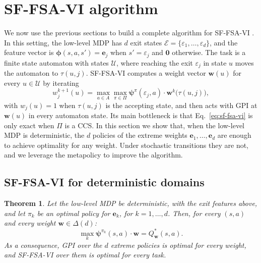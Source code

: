 \documentclass[11pt]{article}
\newcommand{\vphi}{\bm{\phi}}      %
\newcommand{\vpsi}{\bm{\psi}}      %
\newtheorem{theorem}{Theorem}
\begin{document}
\section{SF-FSA-VI algorithm}\label{sec:fsa}

We now use the previous sections to build a complete algorithm for SF-FSA-VI \cite{kuric_planning_2024}. In this setting, the low-level MDP has $d$ exit states $\mathcal{E} = \{\varepsilon_1, \dots, \varepsilon_d\}$, and the feature vector is $\vphi(s,a,s') = \mathbf{e}_j$ when $s' = \varepsilon_j$ and $\mathbf{0}$ otherwise. The task is a finite state automaton with states $\mathcal{U}$, where reaching the exit $\varepsilon_j$ in state $u$ moves the automaton to $\tau(u,j)$. SF-FSA-VI computes a weight vector $\mathbf{w}(u)$ for every $u \in \mathcal{U}$ by iterating
\begin{equation}\label{eq:sf-fsa-vi}
    w^{k+1}_j(u) = \max_{a \in A} \max_{\pi \in \Pi} \vpsi^{\pi}(\varepsilon_j, a) \cdot \mathbf{w}^k\big(\tau(u,j)\big),
\end{equation}
with $w_j(u) = 1$ when $\tau(u,j)$ is the accepting state, and then acts with GPI at $\mathbf{w}(u)$ in every automaton state. Its main bottleneck is that Eq.~\eqref{eq:sf-fsa-vi} is only exact when $\Pi$ is a CCS. In this section we show that, when the low-level MDP is deterministic, the $d$ policies of the extreme weights $\mathbf{e}_1, \dots, \mathbf{e}_d$ are enough to achieve optimality for any weight. Under stochastic transitions they are not, and we leverage the metapolicy to improve the algorithm.

\subsection{SF-FSA-VI for deterministic domains}

\begin{theorem}\label{thm:det}
    Let the low-level MDP be deterministic, with the exit features above, and let $\pi_k$ be an optimal policy for $\mathbf{e}_k$, for $k = 1, \dots, d$. Then, for every $(s,a)$ and every weight $\mathbf{w} \in \Delta(d)$: 
    \begin{equation}
        \max_{k} \vpsi^{\pi_k}(s,a) \cdot \mathbf{w} = Q^{*}_{\mathbf{w}}(s,a).
    \end{equation}
    As a consequence, GPI over the $d$ extreme policies is optimal for every weight, and SF-FSA-VI over them is optimal for every task.
\end{theorem}
\end{document}
